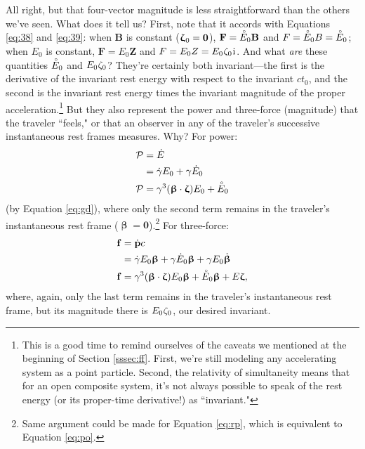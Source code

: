 \documentclass[12pt]{article}
\renewcommand{\mathring}[1]{\accentset{\circ}{#1}}
\renewcommand{\vv}[1]{\mathbf{#1}}
\newcommand{\vvbeta}{\bm{\upbeta}}
\newcommand{\vvzeta}{\bm{\upzeta}}
\begin{document}
All right, but that four-vector magnitude is less straightforward than the others we've seen. What does it tell us? First, note that it accords with Equations \ref{eq:38} and \ref{eq:39}: when $\vv B$ is constant ($\vvzeta_{\mkern1mu 0} = \vv 0$), $\vv F = \mathring{E}_0 \vv B$ and $F = \mathring{E}_0 B = \mathring{E}_0$; when $E_0$ is constant, $\vv F = E_0 \vv Z$ and $F = E_0 Z = E_0 \mkern.5mu \zeta_0 \mkern1mu \mathrm{i}$. And what \emph{are} these quantities $\mathring{E}_0$ and $E_0 \mkern.5mu \zeta_0$? They're certainly both invariant---the first is the derivative of the invariant rest energy with respect to the invariant $c t_0$, and the second is the invariant rest energy times the invariant magnitude of the proper acceleration.\footnote{This is a good time to remind ourselves of the caveats we mentioned at the beginning of Section \ref{sssec:ff}. First, we're still modeling any accelerating system as a point particle. Second, the relativity of simultaneity means that for an open composite system, it's not always possible to speak of the rest energy (or its proper-time derivative!) as ``invariant."} But they also represent the power and three-force (magnitude) that the traveler ``feels," or that an observer in any of the traveler's successive instantaneous rest frames measures. Why? For power:
\begin{equation}\label{eq:po}
\begin{split}
\mathcal{P} &= \dot{E}\\
&= \dot{\gamma} E_0 + \gamma \dot{E}_0\\
\mathcal{P} &= \gamma^3 (\vvbeta \cdot \vvzeta) E_0 + \mathring{E}_0
\end{split}
\end{equation}
(by Equation \ref{eq:gd}), where only the second term remains in the traveler's instantaneous rest frame ($\vvbeta = \vv 0$).\footnote{Same argument could be made for Equation \ref{eq:rp}, which is equivalent to Equation \ref{eq:po}.} For three-force:
\begin{equation}\label{eq:41}
\begin{split}
\vv f &= \dot{\vv p} c\\
&= \dot{\gamma} E_0 \vvbeta + \gamma \dot{E}_0 \vvbeta + \gamma E_0 \dot{\vvbeta}\\
\vv f &=\gamma^3 (\vvbeta \cdot \vvzeta) E_0 \vvbeta + \mathring{E}_0 \vvbeta + E \vvzeta,
\end{split}
\end{equation}
where, again, only the last term remains in the traveler's instantaneous rest frame, but its magnitude there is $E_0 \mkern.5mu \zeta_0$, our desired invariant.
\end{document}
